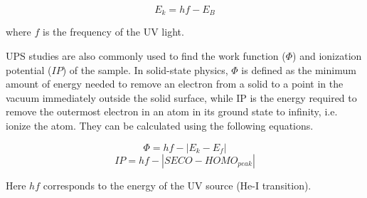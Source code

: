 \documentclass[12pt]{article}
\begin{document}
\begin{equation}
    E_k = hf - E_B
    \label{eqn:energy_conservation}
\end{equation}

\noindent where $f$ is the frequency of the UV light.
\vspace{7pt}

UPS studies are also commonly used to find the work function ($\Phi$) and ionization potential ($IP$) of the sample. In solid-state physics, $\Phi$ is defined as the minimum amount of energy needed to remove an electron from a solid to a point in the vacuum immediately outside the solid surface, while IP is the energy required to remove the outermost electron in an atom in its ground state to infinity, i.e. ionize the atom. They can be calculated using the following equations.

\begin{equation}
    \Phi = hf - |E_k - E_f|
    \label{eqn:phi}
\end{equation}
\begin{equation}
    IP = hf - |SECO - HOMO_{peak}|
    \label{eqn:IP}
\end{equation}

Here $hf$ corresponds to the energy of the UV source (He-I transition).
\end{document}
